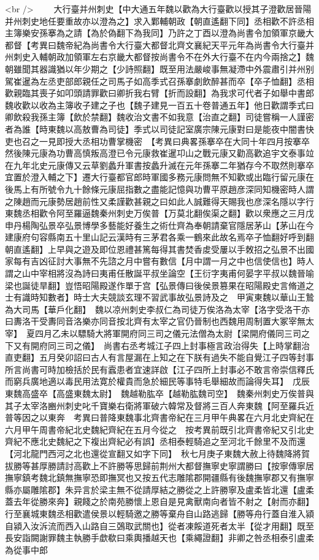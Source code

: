 <br />
　　大行臺并州刺史【中大通五年魏以歡為大行臺歡以授其子澄歡居晉陽并州刺史地任要重故亦以澄為之】求入鄴輔朝政【朝直遙翻下同】丞相歡不許丞相主簿樂安孫搴為之請【為於偽翻下為我同】乃許之丁酉以澄為尚書令加領軍京畿大都督【考異曰魏帝紀為尚書令大行臺大都督北齊文襄紀天平元年為尚書令大行臺并州刺史入輔朝政加領軍左右京畿大都督按尚書令不在外大行臺不在内今兩捨之】魏朝雖聞其器識猶以年少期之【少詩照翻】既至用法嚴峻事無凝滯中外震肅引并州别駕崔暹為左丞吏部郎親任之司馬子如高季式召孫搴劇飲醉甚而卒【卒子恤翻】丞相歡親臨其喪子如叩頭請罪歡曰卿折我右臂【折而設翻】為我求可代者子如舉中書郎魏收歡以收為主簿收子建之子也【魏子建見一百五十卷普通五年】他日歡謂季式曰卿飲殺我孫主簿【飲於禁翻】魏收治文書不如我意【治直之翻】司徒嘗稱一人謹密者為誰【時東魏以高敖曹為司徒】季式以司徒記室廣宗陳元康對曰是能夜中闇書快吏也召之一見即授大丞相功曹掌機密　【考異曰典畧孫搴卒在大同十年四月按搴卒然後陳元康為功曹高慎叛高澄已令元康救崔暹卭山之戰元康又勸高歡追宇文泰事竝在九年北史元康傳又云草劉蠡升軍書按蠡升滅在元年孫搴二年猶存今不取然則搴卒宜置於澄入輔之下】遷大行臺都官郎時軍國多務元康問無不知歡或出臨行留元康在後馬上有所號令九十餘條元康屈指數之盡能記憶與功曹平原趙彦深同知機密時人謂之陳趙而元康勢居趙前性又柔謹歡甚親之曰如此人誠難得天賜我也彦深名隱以字行　東魏丞相歡令阿至羅逼魏秦州刺史万俟普【万莫北翻俟渠之翻】歡以衆應之三月戊申丹楊陶弘景卒弘景博學多藝能好養生之術仕齊為奉朝請棄官隱居茅山【茅山在今建康府句容縣南五十里山記云漢時有三茅君各乘一鶴來此故名焉卒子恤翻好呼到翻朝直遙翻】上早與之遊及即位恩禮甚篤每得其書焚香䖍受屢以手敇招之弘景不出國家每有吉凶征討大事無不先諮之月中嘗有數信【月中謂一月之中也信使信也】時人謂之山中宰相將沒為詩曰夷甫任散誕平叔坐論空【王衍字夷甫何晏字平叔以魏晉喻梁也誕徒旱翻】豈悟昭陽殿遂作單于宫【弘景傳曰後侯景篡果在昭陽殿史言脩道之士有識時知數者】時士大夫競談玄理不習武事故弘景詩及之　甲寅東魏以華山王鷙為大司馬【華戶化翻】　魏以凉州刺史李叔仁為司徒万俟洛為太宰【洛字受洛干亦曰夀洛干受夀同音洛樂亦同音按北齊有太宰之官仍晉制也西魏用周制置大冢宰無太宰】　夏四月乙未以驃騎大將軍開府同三司之儀元法僧為太尉【梁開府儀同三司之下又有開府同三司之儀】　尚書右丞考城江子四上封事極言政治得失【上時掌翻治直吏翻】五月癸卯詔曰古人有言屋漏在上知之在下朕有過失不能自覺江子四等封事所言尚書可時加檢括於民有蠧患者宜速詳啟【江子四所上封事必不敢言帝崇信釋氏而窮兵廣地適以毒民用法寛於權貴而急於細民等事特毛舉細故而論得失耳】　戊辰東魏高盛卒【高盛東魏太尉】　魏越勒肱卒【越勒肱魏司空】　魏秦州刺史万俟普與其子太宰洛豳州刺史叱千寶樂右衛將軍破六韓常及督將三百人奔東魏【阿至羅兵近普等因之以東奔　考異曰普降東魏事北齊書帝紀在三月甲午典畧在六月北史齊紀在六月甲午周書帝紀北史魏紀齊紀在五月今從之　按考異前既引北齊書帝紀又引北史齊紀不應北史魏紀之下複出齊紀必有誤】丞相泰輕騎追之至河北千餘里不及而還【河北龍門西河之北也還從宣翻又如字下同】　秋七月庚子東魏大赦上待魏降將賀拔勝等甚厚勝請討高歡上不許勝等思歸前荆州大都督撫寧史寧謂勝曰【按寧傳寧居撫寧鎮考魏北鎮無撫寧恐即撫冥也又按五代志雕隂郡開疆縣有後魏撫寧郡又有撫寧縣亦屬雕隂郡】朱异言於梁主無不從請厚結之勝從之上許勝寧及盧柔皆北還【盧柔蓋去年從勝來奔】親餞之於南苑勝懷上恩自是見禽獸南向者皆不射之【射而亦翻】行至襄城東魏丞相歡遣侯景以輕騎邀之勝等棄舟自山路逃歸【勝等舟行蓋自淮入潁自潁入汝泝流而西入山路自三鵶取武關也】從者凍餒道死者太半【從才用翻】既至長安詣闕謝罪魏主執勝手歔欷曰乘輿播越天也【乘繩證翻】非卿之咎丞相泰引盧柔為從事中郎